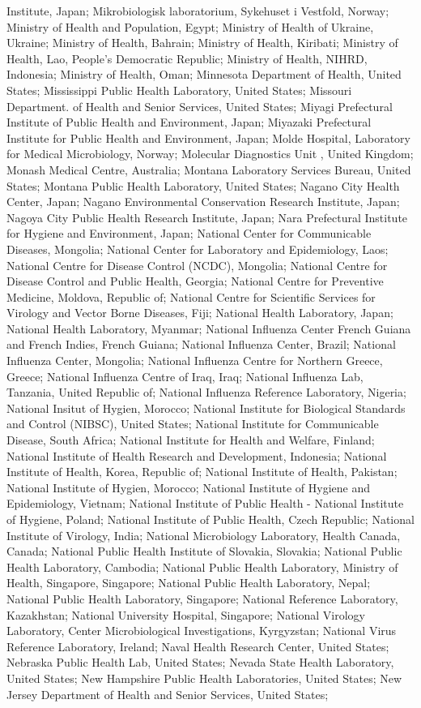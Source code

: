 Institute, Japan; Mikrobiologisk laboratorium, Sykehuset i Vestfold, Norway; Ministry of Health and Population, Egypt; Ministry of Health of Ukraine, Ukraine; Ministry of Health, Bahrain; Ministry of Health, Kiribati; Ministry of Health, Lao, People's Democratic Republic; Ministry of Health, NIHRD, Indonesia; Ministry of Health, Oman; Minnesota Department of Health, United States; Mississippi Public Health Laboratory, United States; Missouri Department. of Health and Senior Services, United States; Miyagi Prefectural Institute of Public Health and Environment, Japan; Miyazaki Prefectural Institute for Public Health and Environment, Japan; Molde Hospital, Laboratory for Medical Microbiology, Norway; Molecular Diagnostics Unit , United Kingdom; Monash Medical Centre, Australia; Montana Laboratory Services Bureau, United States; Montana Public Health Laboratory, United States; Nagano City Health Center, Japan; Nagano Environmental Conservation Research Institute, Japan; Nagoya City Public Health Research Institute, Japan; Nara Prefectural Institute for Hygiene and Environment, Japan; National Center for Communicable Diseases, Mongolia; National Center for Laboratory and Epidemiology, Laos; National Centre for Disease Control (NCDC), Mongolia; National Centre for Disease Control and Public Health, Georgia; National Centre for Preventive Medicine, Moldova, Republic of; National Centre for Scientific Services for Virology and Vector Borne Diseases, Fiji; National Health Laboratory, Japan; National Health Laboratory, Myanmar; National Influenza Center French Guiana and French Indies, French Guiana; National Influenza Center, Brazil; National Influenza Center, Mongolia; National Influenza Centre for Northern Greece, Greece; National Influenza Centre of Iraq, Iraq; National Influenza Lab, Tanzania, United Republic of; National Influenza Reference Laboratory, Nigeria; National Insitut of Hygien, Morocco; National Institute for Biological Standards and Control (NIBSC), United States; National Institute for Communicable Disease, South Africa; National Institute for Health and Welfare, Finland; National Institute of Health Research and Development, Indonesia; National Institute of Health, Korea, Republic of; National Institute of Health, Pakistan; National Institute of Hygien, Morocco; National Institute of Hygiene and Epidemiology, Vietnam; National Institute of Public Health - National Institute of Hygiene, Poland; National Institute of Public Health, Czech Republic; National Institute of Virology, India; National Microbiology Laboratory, Health Canada, Canada; National Public Health Institute of Slovakia, Slovakia; National Public Health Laboratory, Cambodia; National Public Health Laboratory, Ministry of Health, Singapore, Singapore; National Public Health Laboratory, Nepal; National Public Health Laboratory, Singapore; National Reference Laboratory, Kazakhstan; National University Hospital, Singapore; National Virology Laboratory, Center Microbiological Investigations, Kyrgyzstan; National Virus Reference Laboratory, Ireland; Naval Health Research Center, United States; Nebraska Public Health Lab, United States; Nevada State Health Laboratory, United States; New Hampshire Public Health Laboratories, United States; New Jersey Department of Health and Senior Services, United States; 